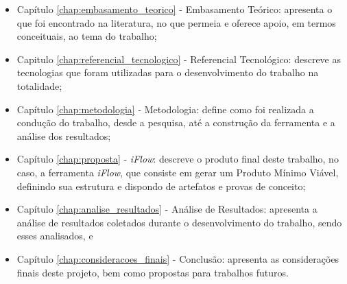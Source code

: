 \begin{itemize}
    \item Capítulo \ref{chap:embasamento_teorico} - Embasamento Teórico: apresenta o que foi encontrado na literatura, no que permeia e oferece apoio, em termos conceituais, ao tema do trabalho;
    \item Capitulo \ref{chap:referencial_tecnologico} - Referencial Tecnológico: descreve as tecnologias que foram utilizadas para o desenvolvimento do trabalho na totalidade;
    \item Capítulo \ref{chap:metodologia} - Metodologia: define como foi realizada a condução do trabalho, desde a pesquisa, até a construção da ferramenta e a análise dos resultados;
    \item Capítulo \ref{chap:proposta} - \textit{iFlow}: descreve o produto final deste trabalho, no caso, a ferramenta \textit{iFlow}, que consiste em gerar um Produto Mínimo Viável, definindo sua estrutura e dispondo de artefatos e provas de conceito;  
    \item Capítulo \ref{chap:analise_resultados} - Análise de Resultados: apresenta a análise de resultados coletados durante o desenvolvimento do trabalho, sendo esses analisados, e
    \item Capítulo \ref{chap:consideracoes_finais} - Conclusão: apresenta as considerações finais deste projeto, bem como propostas para trabalhos futuros.
\end{itemize}